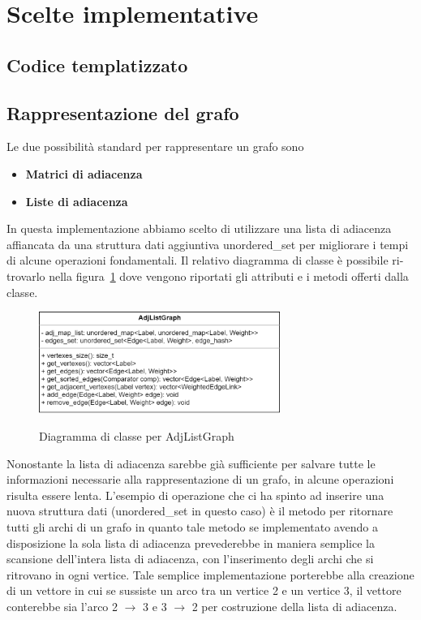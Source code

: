 \section{Scelte implementative}
\label{cap:implementation-choices}

\subsection{Codice templatizzato}

\subsection{Rappresentazione del grafo}

Le due possibilità standard per rappresentare un grafo sono 
\begin{itemize}
	\item \textbf{Matrici di adiacenza}
	\item \textbf{Liste di adiacenza}
\end{itemize}

In questa implementazione abbiamo scelto di utilizzare una lista di adiacenza affiancata da una struttura dati aggiuntiva unordered\_set per migliorare i tempi di alcune operazioni fondamentali. Il relativo diagramma di classe è possibile ri-trovarlo nella figura~\ref{fig:AdjListGraph Class} dove vengono riportati gli attributi e i metodi offerti dalla classe.

\begin{figure}[h]
	\caption{Diagramma di classe per AdjListGraph}
	\centering
	\includegraphics[width=0.7\textwidth]{./images/AdjListGrapClassDiagram.png}
	\label{fig:AdjListGraph Class}
\end{figure}

Nonostante la lista di adiacenza sarebbe già sufficiente per salvare tutte le informazioni necessarie alla rappresentazione di un grafo, in alcune operazioni risulta essere lenta. L'esempio di operazione che ci ha spinto ad inserire una nuova struttura dati (unordered\_set in questo caso) è il metodo per ritornare tutti gli archi di un grafo in quanto tale metodo se implementato avendo a disposizione la sola lista di adiacenza prevederebbe in maniera semplice la scansione dell'intera lista di adiacenza, con l'inserimento degli archi che si ritrovano in ogni vertice. Tale semplice implementazione porterebbe alla creazione di un vettore in cui se sussiste un arco tra un vertice 2 e un vertice 3, il vettore conterebbe sia l'arco 2 $\rightarrow$ 3 e 3 $\rightarrow$ 2 per costruzione della lista di adiacenza. \\

